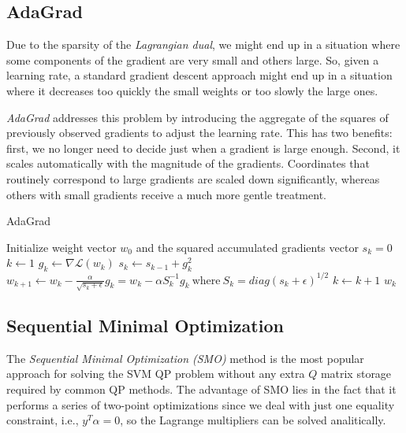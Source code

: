 \subsection{AdaGrad}

Due to the sparsity of the \emph{Lagrangian dual}, we might end up in a situation where some components of the gradient are very small and others large. So, given a learning rate, a standard gradient descent approach might end up in a situation where it decreases too quickly the small weights or too slowly the large ones.

\emph{AdaGrad} \cite{duchi2011adaptive} addresses this problem by introducing the aggregate of the squares of previously observed gradients to adjust the learning rate. This has two benefits: first, we no longer need to decide just when a gradient is large enough. Second, it scales automatically with the magnitude of the gradients. Coordinates that routinely correspond to large gradients are scaled down significantly, whereas others with small gradients receive a much more gentle treatment.

\begin{algorithm}[H]
	\caption{AdaGrad}
	\label{alg:adagrad}
	\begin{algorithmic}
			\State Initialize weight vector $w_0$ and the squared accumulated gradients vector $s_k = 0$
			\State $k \gets 1$
				\State $g_k \gets \nabla \mathcal{L}(w_k)$
				\State $s_k \gets s_{k-1} + g_k^2$
				\State $w_{k+1} \gets w_k - \displaystyle \frac{\alpha}{\sqrt{s_k + \epsilon}} g_k = w_k - \alpha S_k^{-1} g_k \ \text{where} \ S_k = diag(s_k + \epsilon)^{1/2}$
				\State $k \gets k + 1$
			\EndWhile
			\State \Return $w_k$
		\EndFunction
	\end{algorithmic}
\end{algorithm}

\subsection{Sequential Minimal Optimization}

The \emph{Sequential Minimal Optimization (SMO)} \cite{platt1998sequential} method is the most popular approach for solving the SVM QP problem without any extra $Q$ matrix storage required by common QP methods. The advantage of SMO lies in the fact that it performs a series of two-point optimizations since we deal with just one equality constraint, i.e., $y^T \alpha=0$, so the Lagrange multipliers can be solved analitically.

